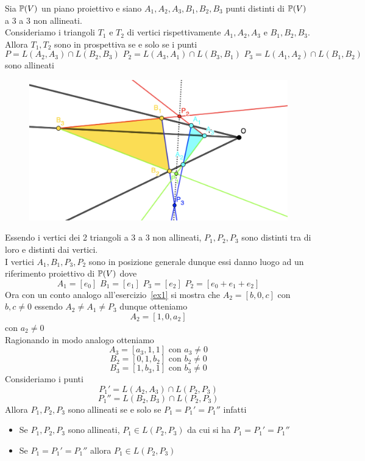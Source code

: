 \begin{thm}[di Desagues]Sia $\mathbb{P}(V)$ un piano proiettivo e siano $A_1,A_2,A_3,B_1,B_2,B_3$ punti distinti di $\mathbb{P}(V)$ a 3 a 3 non allineati.\\
Consideriamo i triangoli $T_1$ e $T_2$ di vertici rispettivamente $A_1,A_2,A_3$ e $B_1,B_2,B_3$.\\
Allora $T_1,T_2$ sono in prospettiva se e solo se i punti 
$$ P=L(A_2,A_3) \cap L(B_2,B_3) \, \, P_2=L(A_3,A_1) \cap L(B_3,B_1) \, \, P_3= L(A_1,A_2) \cap L(B_1,B_2)$$
sono allineati
\begin{figure}[!h]
\centering
\includegraphics[scale=0.5]{Figure/05_06}
\end{figure}
\proof Essendo i vertici dei 2 triangoli a $3$ a $3$ non allineati, $P_1,P_2,P_3$ sono distinti tra di loro e distinti dai vertici.\\
I vertici $A_1, B_1, P_3,P_2$ sono in posizione generale dunque essi danno luogo ad un riferimento proiettivo di $\mathbb{P}(V)$ dove 
$$ A_1 =[e_0] \,\, B_1=[e_1] \, \, P_3=[e_2] \, \, P_2=[e_0+e_1+e_2]$$
Ora con un conto analogo all'esercizio~\ref{ex1} si mostra che 
$A_2=[ b, 0 , c]$ con $b,c\neq 0$ essendo $A_2\neq A_1\neq P_3$ dunque otteniamo $$A_2=[1, 0, a_2]$$ con $a_2\neq 0$\\
Ragionando in modo analogo otteniamo 
$$ A_3 = [ a_3,1,1] \text{ con } a_3\neq 0$$
$$ B_2=[0,1,b_2]\text{ con } b_2\neq 0$$
$$ B_3=[1,b_3,1]\text{ con } b_3\neq 0$$
Consideriamo i punti $$P_1'=L(A_2,A_3) \cap L(P_2,P_3)$$
$$P_1''=L(B_2,B_3)\cap L(P_2,P_3)$$
Allora $P_1,P_2,P_3$ sono allineati se e solo se 
$P_1=P_1'=P_1''$
infatti 
\begin{itemize}
\item Se $P_1,P_2,P_3$ sono allineati, $P_1\in L(P_2,P_3)$ da cui si ha $P_1=P_1'=P_1''$
\item Se $P_1=P_1'=P_1''$ allora $P_1\in L(P_2,P_3)$ 

\end{itemize}
\end{thm}
